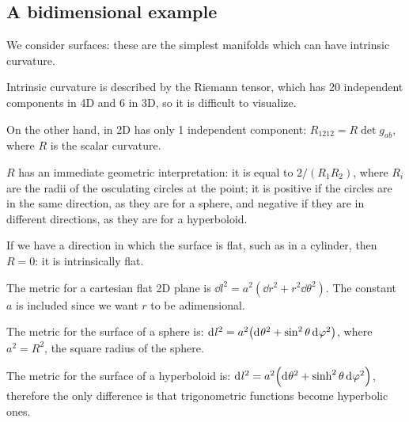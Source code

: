 \documentclass[main.tex]{subfiles}
\begin{document}


\subsection{A bidimensional example}

We consider surfaces: these are the simplest manifolds which can have intrinsic curvature.

\begin{bluebox}
Intrinsic curvature is described by the Riemann tensor, which has 20 independent components in 4D and 6 in 3D, so it is difficult to visualize.

On the other hand, in 2D has only 1 independent component: \(R_{1212} = R \det g_{ab}\), where \(R\) is the scalar curvature. 

\(R\) has an immediate geometric interpretation: it is equal to \(2/(R_1 R_2)\), where \(R_i\) are the radii of the osculating circles at the point; it is positive if the circles are in the same direction, as they are for a sphere, and negative if they are in different directions, as they are for a hyperboloid.

If we have a direction in which the surface is flat, such as in a cylinder, then \(R=0\): it is intrinsically flat.
\end{bluebox}

The metric for a cartesian flat 2D plane is \(\dd{l^2} = a^2 (\dd{r^2} + r^2 \dd{\theta^2}) \).
The constant \(a\) is included since we want \(r\) to be adimensional.

The metric for the surface of a sphere is:
\(\dd[]{l^2} = a^2 \qty(\dd[]{\theta^2} + \sin^2 \theta \dd[]{\varphi^2}) \),
where \(a^2 = R^2\), the square radius of the sphere.

The metric for the surface of a hyperboloid is:
\(\dd[]{l^2} = a^2 \qty(\dd[]{\theta^2} + \sinh^2 \theta \dd[]{\varphi^2}) \),
therefore the only difference is that trigonometric functions become hyperbolic ones.
\end{document}
